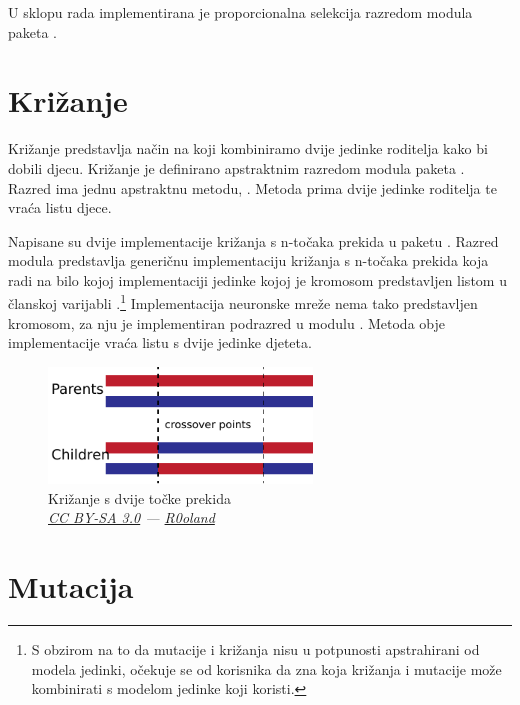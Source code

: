 \documentclass[times, utf8, zavrsni, numeric]{fer}
\begin{document}
U sklopu rada implementirana je proporcionalna selekcija  razredom  modula
 paketa .


\section{Križanje}

Križanje  predstavlja način na koji kombiniramo dvije jedinke
roditelja kako bi dobili djecu. Križanje je definirano apstraktnim razredom
 modula  paketa . Razred
ima jednu apstraktnu metodu, . Metoda prima dvije jedinke
roditelja te vraća listu djece.

Napisane su dvije implementacije križanja s n-točaka prekida  u paketu . Razred  modula
 predstavlja generičnu implementaciju križanja s
n-točaka prekida koja radi na bilo kojoj implementaciji jedinke kojoj je
kromosom predstavljen listom u članskoj varijabli
.\footnote{S obzirom na to da mutacije i križanja nisu u
potpunosti apstrahirani od modela jedinki, očekuje se od korisnika da zna koja
križanja i mutacije može kombinirati s modelom jedinke koji koristi.}
Implementacija neuronske mreže nema tako predstavljen kromosom, za nju je
implementiran podrazred  u modulu
.  Metoda  obje implementacije vraća
listu s dvije jedinke djeteta.

\begin{figure}[h] 
    \centering
    \includegraphics[width=7cm]{img/two-point-crossover}
    \caption{Križanje s dvije točke prekida\\ \textsl{\scriptsize
    \href{https://creativecommons.org/licenses/by-sa/3.0/deed.en}{CC BY-SA 3.0}
    ---
    \href{https://commons.wikimedia.org/wiki/File:TwoPointCrossover.svg}{R0oland}}}\label{fig:two-point-crossover}
\end{figure}


\section{Mutacija}
\end{document}

